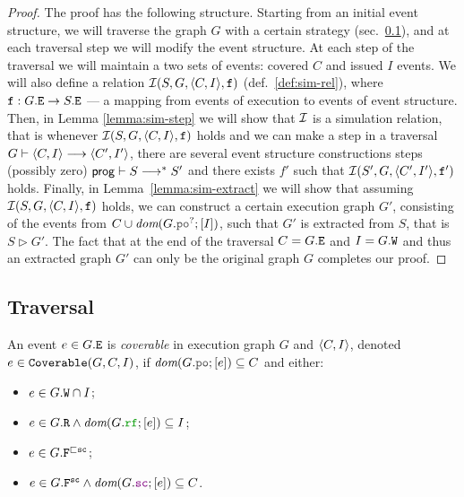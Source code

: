 \documentclass[12pt]{article}
\begin{document}
\begin{proof}
  The proof has the following structure.
  Starting from an initial event structure,
  we will traverse the graph $G$ with a certain strategy (sec.~\ref{sec:traversal}),
  and at each traversal step we will modify the event structure.
  At each step of the traversal we will maintain a two sets of events:
  covered $C$ and issued $I$ events.
  We will also define a relation $\mathcal{I}(S, G, \langle C, I \rangle, {\mathtt{f}})$ (def.~\ref{def:sim-rel}),
  where ${\mathtt{f}} : G.{\mathtt{E}} \rightarrow S.{\mathtt{E}}$ --- a mapping from events of execution 
  to events of event structure.
  Then, in Lemma \ref{lemma:sim-step} we will show that $\mathcal{I}$ is a simulation relation,
  that is whenever $\mathcal{I}(S, G, \langle C, I \rangle, {\mathtt{f}})$ holds and 
  we can make a step in a traversal 
  $G \vdash \langle C, I \rangle \longrightarrow \langle C', I' \rangle$,
  there are several event structure constructions steps (possibly zero)
  $\mathsf{prog} \vdash S \longrightarrow^* S'$ and there exists $f'$
  such that $\mathcal{I}(S', G, \langle C', I' \rangle, {\mathtt{f}}')$ holds.
  Finally, in Lemma~\ref{lemma:sim-extract} we will show that
  assuming $\mathcal{I}(S, G, \langle C, I \rangle, {\mathtt{f}})$ holds, 
  we can construct a certain execution graph $G'$, 
  consisting of the events from $C \cup \dom{G.\lPO^?;[I]}$, 
  such that $G'$ is extracted from $S$, that is $S \rhd G'$.
  The fact that at the end of the traversal $C = G.{\mathtt{E}}$ and $I = G.{\mathtt{W}}$
  and thus an extracted graph $G'$ can only be the original graph $G$ 
  completes our proof.
\end{proof}

\subsection{Traversal}
\label{sec:traversal}

\begin{definition}
  An event $e \in G.{\mathtt{E}}$ is \emph{coverable} in \imm execution graph $G$ and $\langle C, I \rangle$,
  denoted $e \in {\mathtt{Coverable}}(G, C, I)$, 
  if $\dom{G.\lPO;[e]} \subseteq C$ and either:
  \begin{itemize}
    \item $e \in G.{\mathtt{W}} \cap I$;
    \item $e \in G.\lR \wedge \dom{G.\lRF;[e]} \subseteq I$;
    \item $e \in G.{\mathtt{F}}^{\sqsubset{\mathtt{sc}}}$;
    \item $e \in G.\lF^{\sco} \wedge \dom{G.\lSC;[e]} \subseteq C$.
  \end{itemize}
\end{definition}
\end{document}
